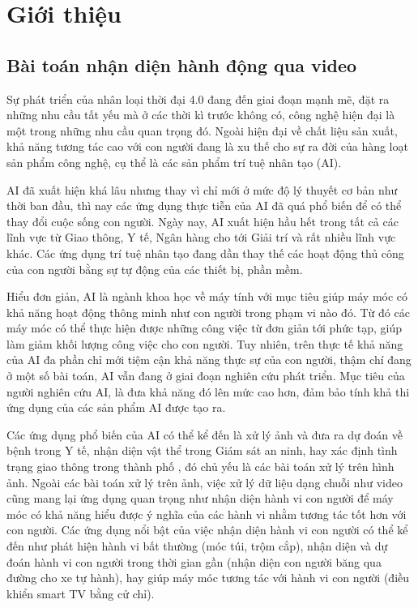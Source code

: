 \section{Giới thiệu}
\subsection{Bài toán nhận diện hành động qua video}
Sự phát triển của nhân loại thời đại 4.0 đang đến giai đoạn mạnh mẽ, đặt
ra những nhu cầu tất yếu mà ở các thời kì trước không có, công nghệ hiện đại
là một trong những nhu cầu quan trọng đó. Ngoài hiện đại về chất liệu sản xuất, khả năng tương tác cao với
con người đang là xu thế cho sự ra đời của hàng loạt sản phẩm công nghệ, cụ thể là các sản phẩm trí tuệ nhân tạo (AI).

AI đã xuất hiện khá lâu nhưng thay vì chỉ mới ở mức độ lý thuyết cơ bản như thời ban đầu, thì nay các ứng dụng
thực tiễn của AI đã quá phổ biến để có thể thay đổi cuộc sống con người. Ngày nay, AI xuất hiện hầu hết trong tất cả các lĩnh
vực từ Giao thông, Y tế, Ngân hàng cho tới Giải trí và rất nhiều lĩnh vực khác. Các ứng dụng trí tuệ nhân tạo đang
dần thay thế các hoạt động thủ công của con người bằng sự tự động của các thiết bị, phần mềm.

Hiểu đơn giản, AI là ngành khoa học về máy tính với mục tiêu giúp máy móc có khả năng hoạt động thông minh như con người trong phạm vi nào đó.
Từ đó các máy móc có thể  thực hiện được những công việc từ đơn giản tới phức tạp, giúp làm giảm khối lượng công việc cho con người.
Tuy nhiên, trên thực tế khả năng của AI đa phần chỉ mới tiệm cận khả năng thực sự của con người, thậm chí đang ở một số bài toán, AI vẫn đang ở giai đoạn
nghiên cứu phát triển. Mục tiêu của người nghiên cứu AI, là đưa khả năng đó lên mức cao hơn, đảm bảo tính khả thi ứng dụng của các sản phẩm AI được tạo ra.

Các ứng dụng phổ  biến của AI có thể kể đến là xử lý ảnh và đưa ra dự đoán về bệnh trong Y tế, nhận diện vật thể trong Giám sát an ninh,
hay xác định tình trạng giao thông trong thành phố , đó chủ yếu là các bài toán xử lý trên hình ảnh. Ngoài các bài toán xử lý trên ảnh,
việc xử lý dữ liệu dạng chuỗi như video cũng mang lại ứng dụng quan trọng như nhận diện hành vi con người để  máy móc có khả năng
hiểu được ý nghĩa của các hành vi nhằm tương tác tốt hơn với con người. Các ứng dụng  nổi bật  của việc nhận diện hành vi con người có thể
kể đến như phát hiện hành vi bất thường (móc túi, trộm cắp), nhận diện và dự đoán hành vi con người trong thời gian gần (nhận diện con người băng qua đường cho xe tự hành),
hay giúp máy móc tương tác với hành vi con người (điều khiển smart TV bằng cử chỉ).


